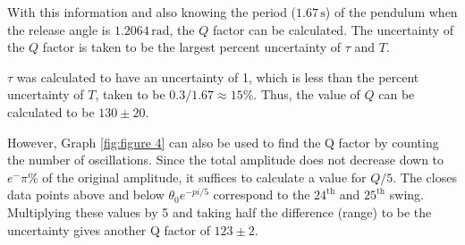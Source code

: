 \documentclass[12pt]{article}
\begin{document}
With this information and also knowing the period ($1.67\,\text{s}$) of the pendulum when the release angle is $1.2064\,\text{rad}$, the $Q$ factor can be calculated. The uncertainty of the $Q$ factor is taken to be the largest percent uncertainty of $\tau$ and $T$.

$\tau$ was calculated to have an uncertainty of 1, which is less than the percent uncertainty of $T$, taken to be $0.3/1.67 \approx 15\%$. Thus, the value of $Q$ can be calculated to be $130 \pm 20$.

However, Graph \ref{fig:figure 4} can also be used to find the Q factor by counting the number of oscillations. Since the total amplitude does not decrease down to $e^-\pi \%$ of the original amplitude, it suffices to calculate a value for $Q/5$. The closes data points above and below $\theta_0e^{-{pi/5}}$ correspond to the $24^\text{th}$ and $25^\text{th}$ swing. Multiplying these values by 5 and taking half the difference (range) to be the uncertainty gives another Q factor of $123 \pm 2$.

\end{document}

